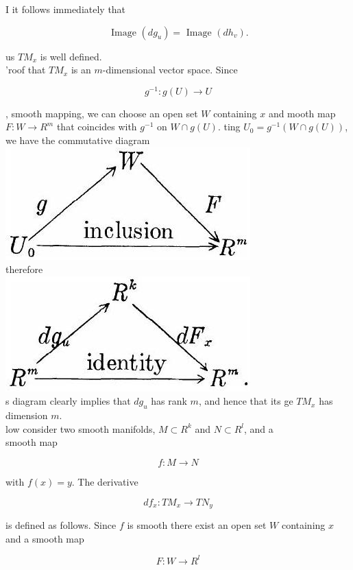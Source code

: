 \documentclass[10pt, letterpaper]{article}
\begin{document}
I it follows immediately that

$$
\text { Image }\left(d g_{u}\right)=\text { Image }\left(d h_{v}\right) .
$$

us $T M_{x}$ is well defined.\\
'roof that $T M_{x}$ is an $m$-dimensional vector space. Since

$$
g^{-1}: g(U) \rightarrow U
$$

, smooth mapping, we can choose an open set $W$ containing $x$ and mooth map $F: W \rightarrow R^{m}$ that coincides with $g^{-1}$ on $W \cap g(U)$. ting $U_{0}=g^{-1}(W \cap g(U))$, we have the commutative diagram\\
\includegraphics[scale=0.2, center]{2025_05_28_7c9927389b272ddbc2c3g-16(3)}\\
therefore\\
\includegraphics[scale=0.2, center]{2025_05_28_7c9927389b272ddbc2c3g-16}\\
s diagram clearly implies that $d g_{u}$ has rank $m$, and hence that its ge $T M_{x}$ has dimension $m$.\\
low consider two smooth manifolds, $M \subset R^{k}$ and $N \subset R^{l}$, and a\\
smooth map

$$
f: M \rightarrow N
$$

with $f(x)=y$. The derivative

$$
d f_{x}: T M_{x} \rightarrow T N_{y}
$$

is defined as follows. Since $f$ is smooth there exist an open set $W$ containing $x$ and a smooth map

$$
F: W \rightarrow R^{l}
$$
\end{document}

